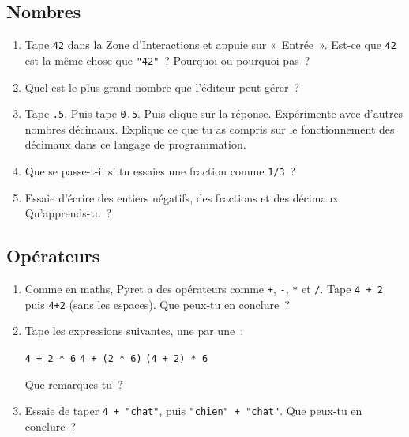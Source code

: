 \documentclass[12pt,a4paper]{article}
\newcommand{\pyret}[1]{\texttt{#1}}
\newcommand{\ligne}[1]{\vspace{0.3em}\par\noindent\dotfill\par\vspace{0.3em}}
\begin{document}
\subsection*{Nombres}

\begin{enumerate}[leftmargin=*,resume]
  \item Tape \pyret{42} dans la Zone d'Interactions et appuie sur «~Entrée~». Est-ce que \pyret{42} est la même chose que \pyret{"42"}~? Pourquoi ou pourquoi pas~?

  \ligne{4}

  \item Quel est le plus grand nombre que l'éditeur peut gérer~?

  \ligne{2}

  \item Tape \pyret{.5}. Puis tape \pyret{0.5}. Puis clique sur la réponse. Expérimente avec d'autres nombres décimaux. Explique ce que tu as compris sur le fonctionnement des décimaux dans ce langage de programmation.

  \ligne{5}

  \item Que se passe-t-il si tu essaies une fraction comme \pyret{1/3}~?

  \ligne{3}

  \item Essaie d'écrire des entiers négatifs, des fractions et des décimaux. Qu'apprends-tu~?

  \ligne{3}
\end{enumerate}

\subsection*{Opérateurs}

\begin{enumerate}[leftmargin=*,resume]
  \item Comme en maths, Pyret a des opérateurs comme \pyret{+}, \pyret{-}, \pyret{*} et \pyret{/}. Tape \pyret{4 + 2} puis \pyret{4+2} (sans les espaces). Que peux-tu en conclure~?

  \ligne{3}

  \item Tape les expressions suivantes, une par une~:

  \begin{center}
  \pyret{4 + 2 * 6} \hspace{3em} \pyret{4 + (2 * 6)} \hspace{3em} \pyret{(4 + 2) * 6}
  \end{center}

  Que remarques-tu~?

  \ligne{4}

  \item Essaie de taper \pyret{4 + "chat"}, puis \pyret{"chien" + "chat"}. Que peux-tu en conclure~?

  \ligne{4}
\end{enumerate}
\end{document}
